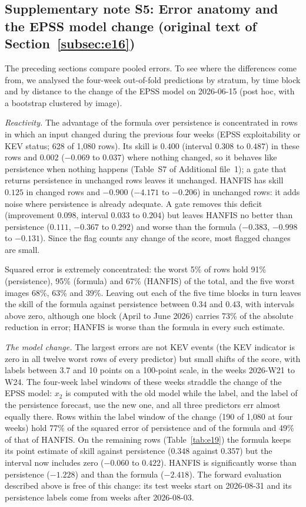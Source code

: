 \documentclass[pdflatex,sn-basic]{sn-jnl}
\theoremstyle{thmstyleone}%
\theoremstyle{thmstyletwo}%
\theoremstyle{thmstylethree}%
\begin{document}
\subsection*{Supplementary note S5: Error anatomy and the EPSS model change (original text of Section~\ref{subsec:e16})}
The preceding sections compare pooled errors. To see where the differences come from, we analysed the four-week out-of-fold predictions by stratum, by time block and by distance to the change of the EPSS model on 2026-06-15 (post hoc, with a bootstrap clustered by image).

\emph{Reactivity.} The advantage of the formula over persistence is concentrated in rows in which an input changed during the previous four weeks (EPSS exploitability or KEV status; 628 of 1{,}080 rows). Its skill is $0.400$ (interval $0.308$ to $0.487$) in these rows and $0.002$ ($-0.069$ to $0.037$) where nothing changed, so it behaves like persistence when nothing happens (Table~S7 of Additional file~1); a gate that returns persistence in unchanged rows leaves it unchanged. HANFIS has skill $0.125$ in changed rows and $-0.900$ ($-4.171$ to $-0.206$) in unchanged rows: it adds noise where persistence is already adequate. A gate removes this deficit (improvement $0.098$, interval $0.033$ to $0.204$) but leaves HANFIS no better than persistence ($0.111$, $-0.367$ to $0.292$) and worse than the formula ($-0.383$, $-0.998$ to $-0.131$). Since the flag counts any change of the score, most flagged changes are small.

Squared error is extremely concentrated: the worst 5\% of rows hold 91\% (persistence), 95\% (formula) and 67\% (HANFIS) of the total, and the five worst images 68\%, 63\% and 39\%. Leaving out each of the five time blocks in turn leaves the skill of the formula against persistence between $0.34$ and $0.43$, with intervals above zero, although one block (April to June 2026) carries 73\% of the absolute reduction in error; HANFIS is worse than the formula in every such estimate.

\emph{The model change.} The largest errors are not KEV events (the KEV indicator is zero in all twelve worst rows of every predictor) but small shifts of the score, with labels between 3.7 and 10 points on a 100-point scale, in the weeks 2026-W21 to W24. The four-week label windows of these weeks straddle the change of the EPSS model: $x_2$ is computed with the old model while the label, and the label of the persistence forecast, use the new one, and all three predictors err almost equally there. Rows within the label window of the change (190 of 1{,}080 at four weeks) hold 77\% of the squared error of persistence and of the formula and 49\% of that of HANFIS. On the remaining rows (Table~\ref{tab:e19}) the formula keeps its point estimate of skill against persistence ($0.348$ against $0.357$) but the interval now includes zero ($-0.060$ to $0.422$). HANFIS is significantly worse than persistence ($-1.228$) and than the formula ($-2.418$). The forward evaluation described above is free of this change: its test weeks start on 2026-08-31 and its persistence labels come from weeks after 2026-08-03.
\end{document}
